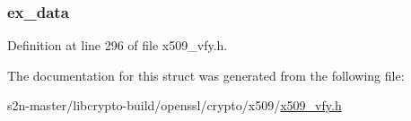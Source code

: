 \subsubsection[{\texorpdfstring{ex\+\_\+data}{ex_data}}]{ ex\+\_\+data}\hypertarget{structx509__store__ctx__st_ac3e4fd59d6ee44a81f3a58114613c1e2}{}\label{structx509__store__ctx__st_ac3e4fd59d6ee44a81f3a58114613c1e2}


Definition at line 296 of file x509\+\_\+vfy.\+h.



The documentation for this struct was generated from the following file\+:\begin{DoxyCompactItemize}
\item 
s2n-\/master/libcrypto-\/build/openssl/crypto/x509/\hyperlink{crypto_2x509_2x509__vfy_8h}{x509\+\_\+vfy.\+h}\end{DoxyCompactItemize}
